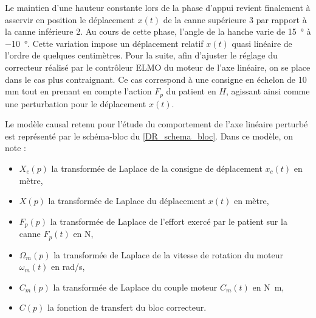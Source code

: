 \noindent Le maintien d'une hauteur constante lors de la phase d'appui revient finalement à asservir en position le déplacement $x(t)$ de la canne supérieure 3 par rapport à la canne inférieure 2.
Au cours de cette phase, l'angle de la hanche varie de \SI{+15}{\degree} à \SI{-10}{\degree}. Cette variation impose un déplacement relatif $x(t)$ quasi linéaire de l'ordre de quelques centimètres. Pour la suite, afin d'ajuster le réglage du correcteur réalisé par le contrôleur ELMO du moteur de l'axe linéaire, on se place dans le cas plus contraignant. Ce cas correspond à une consigne en échelon de 10 mm tout en prenant en compte l'action $F_p$ du patient en $H$, agissant ainsi comme une perturbation pour le déplacement $x(t)$.


%


Le modèle causal retenu pour l'étude du comportement de l'axe linéaire perturbé est représenté par le schéma-bloc du \ref{DR_schema_bloc}. Dans ce modèle, on note :
\begin{itemize}
\item $X_c(p)$ la transformée de Laplace de la consigne de déplacement  $x_c(t)$ en mètre,
\item $X(p)$ la transformée de Laplace du déplacement $x(t)$ en mètre,
\item $F_p(p)$ la transformée de Laplace de   l'effort exercé par le patient sur la canne $F_p(t)$ en N,
\item $\Omega_m(p)$ la transformée de Laplace de la vitesse de rotation du moteur $\omega_m(t)$ en rad/s,
\item $C_m(p)$ la transformée de Laplace du couple moteur $C_m(t)$ en \si{N.m},
\item $C(p)$ la fonction de transfert du bloc correcteur.
\end{itemize}


